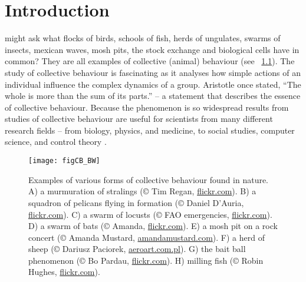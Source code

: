 









\chapter{Introduction}
\label{chap:introduction}


 might ask what flocks of birds, schools of fish, herds of ungulates, swarms of insects, mexican waves, mosh pits, the stock exchange and biological cells have in common? They are all examples of collective (animal) behaviour (see \figurename~\ref{fig:CB}). The study of collective behaviour is fascinating as it analyses how simple actions of an individual influence the complex dynamics of a group. Aristotle once stated, ``The whole is more than the sum of its parts.'' -- a statement that describes the essence of collective behaviour. Because the phenomenon is so widespread results from studies of collective behaviour are useful for scientists from many different research fields -- from biology, physics, and medicine, to social studies, computer science, and control theory \cite{deisboeck2009collective,lebarbajec2009organized,nahin2012chases,silverberg2013collective,spector2003emergence,sumpter2006principles,vicsek1995novel,wei2009pursuit,xu2014crowd}.

\begin{figure}[p]
  \texttt{[image: figCB\_BW]}
  \caption{Examples of various forms of collective behaviour found in nature. A) a murmuration of stralings (© Tim Regan, \href{http://www.flickr.com}{flickr.com}). B) a squadron of pelicans flying in formation (© Daniel D'Auria, \href{http://www.flickr.com}{flickr.com}). C) a swarm of locusts (© FAO emergencies, \href{http://www.flickr.com}{flickr.com}). D) a swarm of bats (© Amanda, \href{http://www.flickr.com}{flickr.com}). E) a mosh pit on a rock concert (© Amanda Mustard, \href{http://www.amandamustard.com/}{amandamustard.com}). F) a herd of sheep (© Dariusz Paciorek, \href{http://www.aeroart.com.pl/}{aeroart.com.pl}). G) the bait ball phenomenon (© Bo Pardau, \href{http://www.flickr.com}{flickr.com}). H) milling fish (© Robin Hughes, \href{http://www.flickr.com}{flickr.com}).}
  \label{fig:CB}
\end{figure}

